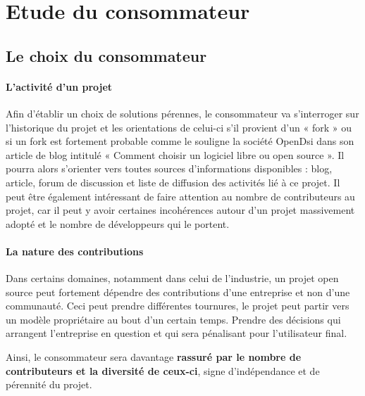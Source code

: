 	\section{Etude du consommateur} %

		\subsection{Le choix du consommateur}

			\paragraph{L'activité d'un projet\\}

			Afin d'établir un choix de solutions pérennes, le consommateur va s'interroger sur l'historique du projet et les orientations de celui-ci s'il provient d'un « \gls{fork} » ou si un fork est fortement probable comme le souligne la société OpenDsi dans son article de blog intitulé « Comment choisir un logiciel libre ou open source ».
			Il pourra alors s'orienter vers toutes sources d'informations disponibles : blog, article, forum de discussion et liste de diffusion des activités lié à ce projet. Il peut être également intéressant de faire attention au nombre de contributeurs au projet, car il peut y avoir certaines incohérences autour d'un projet massivement adopté et le nombre de développeurs qui le portent.

			\paragraph{La nature des contributions\\}
			
				Dans certains domaines, notamment dans celui de l'industrie, un projet open source peut fortement dépendre des contributions d'une entreprise et non d'une communauté. Ceci peut prendre différentes tournures, le projet peut partir vers un modèle propriétaire au bout d'un certain temps. Prendre des décisions qui arrangent l'entreprise en question et qui sera pénalisant pour l'utilisateur final.

				Ainsi, le consommateur sera davantage \textbf{rassuré par le nombre de contributeurs et la diversité de ceux-ci}, signe d'indépendance et de pérennité du projet.

